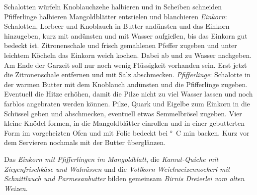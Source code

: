 \begin{recipe}
    \preparation
    {
        \step Schalotten würfeln
        \step Knoblauchzehe halbieren und in Scheiben schneiden
        \step Pfifferlinge halbieren
        \step Mangoldblätter entstielen und blanchieren
        \step \emph{Einkorn}: Schalotten, Lorbeer und Knoblauch in Butter andünsten und das Einkorn hinzugeben, kurz mit andünsten und mit Wasser aufgießen, bis das Einkorn gut bedeckt ist. 
        \step Zitronenschale und frisch gemahlenen Pfeffer zugeben und unter leichtem Köcheln das Einkorn weich kochen. Dabei ab und zu Wasser nachgeben. Am Ende der Garzeit soll nur noch wenig Flüssigkeit vorhanden sein. 
        \step Erst jetzt die Zitronenschale entfernen und mit Salz abschmecken.
        \step \emph{Pfifferlinge}: Schalotte in der warmen Butter mit dem Knoblauch andünsten und die Pfifferlinge zugeben. Eventuell die Hitze erhöhen, damit die Pilze nicht zu viel Wasser lassen und noch farblos angebraten werden können. 
        \step Pilze, Quark und Eigelbe zum Einkorn in die Schüssel geben und abschmecken, eventuell etwas Semmelbrösel zugeben. 
        \step Vier kleine Knödel formen, in die Mangoldblätter einrollen und in einer gebutterten Form im vorgeheizten Ofen und mit Folie bedeckt bei \unit[100]{\degree C} \unit[25-30]{min} backen. 
        \step Kurz vor dem Servieren nochmals mit der Butter überglänzen.
    }
    
    \hint
    {
    	Das \emph{Einkorn mit Pfifferlingen im Mangoldblatt}, die \emph{Kamut-Quiche mit Ziegenfrischkäse und Walnüssen} und die \emph{Vollkorn-Weichweizennockerl mit Schnittlauch und Parmesanbutter} bilden gemeinsam \emph{Birnis Dreierlei vom alten Weizen}.
    }
\end{recipe}